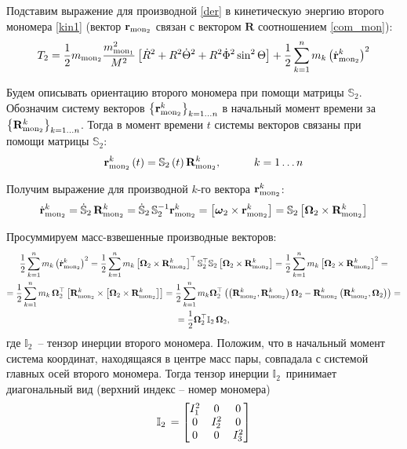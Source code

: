 \documentclass[14pt]{extarticle}
\newcommand{\vR}{\mathbf{R}}
\newcommand{\mmf}{m_{\textup{mon}_1}}
\newcommand{\mms}{m_{\textup{mon}_2}}
\newcommand{\vrms}{\mathbf{r}_{\textup{mon}_2}}
\newcommand{\vRms}{\mathbf{R}_{\textup{mon}_2}}
\newcommand{\dvrms}{\dot{\mathbf{r}}_{\textup{mon}_2}}
\newcommand{\dR}{\dot{R}}
\newcommand{\dTheta}{\dot{\Theta}}
\newcommand{\dPhi}{\dot{\Phi}}
\newcommand{\omt}{\boldsymbol{\omega}_2}
\newcommand{\Omt}{\boldsymbol{\Omega}_2}
\newcommand{\bbSs}{\mathbb{S}_2}
\newcommand{\dbbSs}{\dot{\mathbb{S}}_2 \,}
\newcommand{\bbIt}{\mathbb{I}_2 \,}
\newcommand{\If}{I_1^2}
\newcommand{\Is}{I_2^2}
\newcommand{\It}{I_3^2}
\newcommand{\lb}{\left(}
\newcommand{\rb}{\right)}
\newcommand{\lsq}{\left[}
\newcommand{\rsq}{\right]}
\begin{document}
Подставим выражение для производной \eqref{der} в кинетическую энергию второго мономера \eqref{kin1} (вектор $\vrms$ связан с вектором $\vR$ соотношением \eqref{com_mon}):
\begin{gather}
		T_2 = \frac{1}{2} \mms \frac{\mmf^2}{M^2} \left[ \dR^2 + R^2 \dTheta^2 + R^2 \dPhi^2 \sin^2 \Theta \right] + \frac{1}{2} \sum_{k=1}^n m_k \lb \dvrms^k \rb^2 
\end{gather}

Будем описывать ориентацию второго мономера при помощи матрицы $\bbSs$. Обозначим систему векторов $\left\{ \vrms^k \right\}_{k=1 \dots n}$ в начальный момент времени за $\left\{ \vRms^k \right\}_{k=1 \dots n}$. Тогда в момент времени $t$ системы векторов связаны при помощи матрицы $\bbSs$:
\begin{gather}
	\vrms^k \lb t \rb = \bbSs \lb t \rb \vRms^k, \quad \quad \quad k = 1 \dots n
\end{gather}

Получим выражение для производной $k$-го вектора $\vrms^k$:
\begin{gather}
	\dvrms^k = \dbbSs \vRms^k = \dbbSs \bbSs^{-1} \vrms^k = \lsq \omt \times \vrms^k \rsq = \bbSs \lsq \Omt \times \vRms^k \rsq \label{der2}
\end{gather}

Просуммируем масс-взвешенные производные векторов:
\begin{gather}
\frac{1}{2} \sum_{k=1}^n m_k \lb \dvrms^k \rb^2 = \frac{1}{2} \sum_{k=1}^n m_k \lsq \Omt \times \vRms^k \right]^\top \bbSs^\top \bbSs \lsq \Omt \times \vRms^k \rsq = \frac{1}{2} \sum_{k=1}^n m_k \lsq \Omt \times \vRms^k \rsq^2 = \notag \\
	= \frac{1}{2} \sum_{k=1}^n m_k \, \Omt^\top \lsq \vRms^k \times \lsq \Omt \times \vRms^k \rsq \rsq = \frac{1}{2} \sum_{k=1}^n m_k \Omt^\top \lb \lb \vRms^k, \vRms^k \rb \Omt - \vRms^k \lb \vRms^k, \Omt \rb \rb  = \notag \\ = \frac{1}{2} \Omt^\top \bbIt \Omt, \notag
\end{gather}
где $\bbIt$ -- тензор инерции второго мономера. Положим, что в начальный момент система координат, находящаяся в центре масс пары, совпадала с системой главных осей второго мономера. Тогда тензор инерции $\bbIt$ принимает диагональный вид (верхний индекс -- номер мономера)
\begin{gather}
	\bbIt = \begin{bmatrix}
		\If & 0 & 0 \\
		0 & \Is & 0 \\
		0 & 0 & \It
	\end{bmatrix} \notag
\end{gather}
\end{document}
